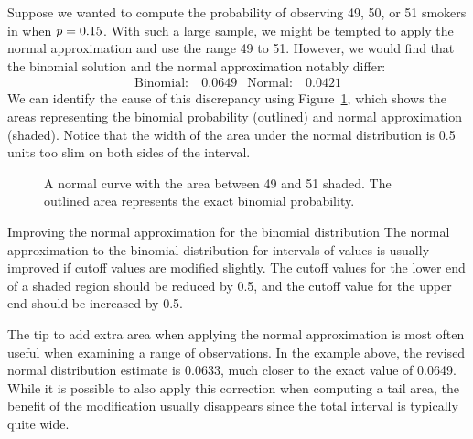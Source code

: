 \newcommand{\smokeA}{49}
\newcommand{\smokeB}{50}
\newcommand{\smokeC}{51}
\newcommand{\smokeABCBinom}{0.0649}
\newcommand{\smokeABCNormal}{0.0421}
\newcommand{\smokeABCNormalFixed}{0.0633}

Suppose we wanted to compute the probability of observing
\smokeA{}, \smokeB{}, or \smokeC{} smokers in \smoken{}
when $p = 0.15{}$.
With such a large sample, we might be tempted to apply
the normal approximation and use the range \smokeA{} to \smokeC{}.
However, we would find that the binomial solution and the normal
approximation notably differ:
\begin{align*}
\text{Binomial:}&\ \smokeABCBinom{}
&\text{Normal:}&\ \smokeABCNormal{}
\end{align*}
We can identify the cause of this discrepancy using
Figure~\ref{normApproxToBinomFail}, which shows the areas
representing the binomial probability (outlined) and normal
approximation (shaded).
Notice that the width of the area under the normal
distribution is 0.5 units too slim on both sides of
the interval.

\begin{figure}[h]
  \centering
  \caption{A normal curve with the area between
      \smokeA{} and \smokeC{} shaded.
      The outlined area represents the exact binomial
      probability.}
  \label{normApproxToBinomFail}
\end{figure}

\begin{onebox}{Improving the normal approximation
    for the binomial distribution}
  The normal approximation to the binomial distribution
  for intervals of values is usually improved if cutoff
  values are modified slightly.
  The cutoff values for the lower end of a shaded region
  should be reduced by 0.5, and the cutoff value for the
  upper end should be increased by 0.5.
\end{onebox}

The tip to add extra area when applying the normal
approximation is most often useful when examining
a range of observations.
In the example above, the revised normal distribution
estimate is \smokeABCNormalFixed{}, much closer to the
exact value of \smokeABCBinom{}.
While it is possible to also apply this correction when
computing a tail area, the benefit of the modification
usually disappears since the total interval is typically
quite wide.




